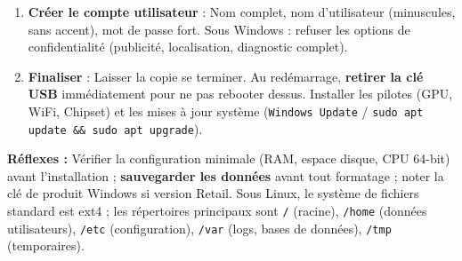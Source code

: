 \documentclass[11pt]{article}
\newcommand{\cle}[1]{{\popxbold\color{popdark}#1}}
\begin{document}
\begin{methode}
\begin{enumerate}
\begin{itemize}
                \begin{itemize}
                  \item \emph{Effacer le disque et installer Ubuntu} : partitionnement automatique (création / en ext4 + swap). Simple, pour machine dédiée.
                  \item \emph{Autre chose (Manuel)} : Obligatoire pour \textbf{dual-boot} ou contrôle fin. Créer :
                        \begin{itemize}
                          \item \texttt{/} (racine) : 30--50 Go, ext4, point de montage \texttt{/}.
                          \item \texttt{/home} : reste du disque, ext4, point de montage \texttt{/home} (sépare données utilisateur du système).
                          \item \texttt{swap} : taille = RAM (si hibernation) ou 4--8 Go, type \emph{zone d'échange}.
                        \end{itemize}
                  \item \textbf{Chargeur de démarrage (Grub) :} Périphérique \texttt{/dev/sda} (ou \texttt{nvme0n1}) : le disque entier, pas une partition.
                \end{itemize}
        \end{itemize}
  \item \textbf{Créer le compte utilisateur} : Nom complet, nom d'utilisateur (minuscules, sans accent), mot de passe fort. Sous Windows : refuser les options de confidentialité (publicité, localisation, diagnostic complet).
  \item \textbf{Finaliser} : Laisser la copie se terminer. Au redémarrage, \textbf{retirer la clé USB} immédiatement pour ne pas rebooter dessus. Installer les pilotes (GPU, WiFi, Chipset) et les mises à jour système (\texttt{Windows Update} / \texttt{sudo apt update \&\& sudo apt upgrade}).
\end{enumerate}

\textbf{Réflexes :} Vérifier la configuration minimale (RAM, espace disque, CPU 64-bit) avant l'installation ; \textbf{sauvegarder les données} avant tout formatage ; noter la clé de produit Windows si version Retail. Sous Linux, le système de fichiers standard est \cle{ext4} ; les répertoires principaux sont \texttt{/} (racine), \texttt{/home} (données utilisateurs), \texttt{/etc} (configuration), \texttt{/var} (logs, bases de données), \texttt{/tmp} (temporaires).
\end{methode}
\end{document}

